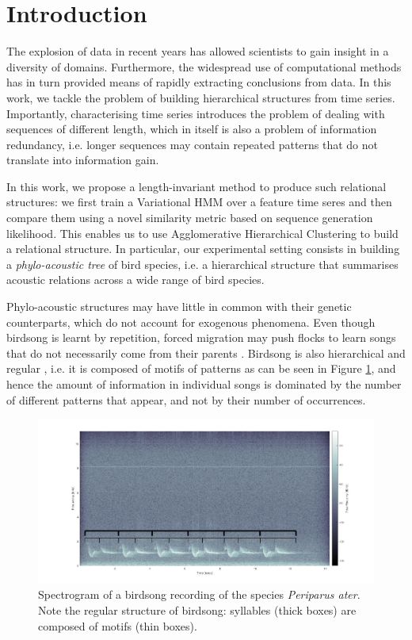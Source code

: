 \documentclass[pdftex,11pt,a4paper]{article}
\theoremstyle{definition}
\theoremstyle{remark}
\begin{document}
\section{Introduction}
\label{section_introduction}
The explosion of data in recent years has allowed scientists to gain insight in a diversity of domains. Furthermore, the widespread use of computational methods has in turn provided means of rapidly extracting conclusions from data. In this work, we tackle the problem of building hierarchical structures from time series. Importantly, characterising time series introduces the problem of dealing with sequences of different length, which in itself is also a problem of information redundancy, i.e. longer sequences may contain repeated patterns that do not translate into information gain.
\par In this work, we propose a length-invariant method to produce such relational structures: we first train a Variational HMM over a feature time seres and then compare them using a novel similarity metric based on sequence generation likelihood. This enables us to use Agglomerative Hierarchical Clustering to build a relational structure. In particular, our experimental setting consists in building a \textit{phylo-acoustic tree} of bird species, i.e. a hierarchical structure that summarises acoustic relations across a wide range of bird species.
\par Phylo-acoustic structures may have little in common with their genetic counterparts, which do not account for exogenous phenomena. Even though birdsong is learnt by repetition, forced migration may push flocks to learn songs that do not necessarily come from their parents \cite{Berwick2013}. Birdsong is also hierarchical and regular \cite{Snowdon2013}, i.e. it is composed of motifs of patterns as can be seen in Figure \ref{fig_birdsong_structure}, and hence the amount of information in individual songs is dominated by the number of different patterns that appear, and not by their number of occurrences. 

\begin{figure}[t]
\centering
\includegraphics[width=\textwidth]{images/birdsong_structure}
\caption{Spectrogram of a birdsong recording of the species \emph{Periparus ater}. Note the regular structure of birdsong: syllables (thick boxes) are composed of motifs (thin boxes).}
\label{fig_birdsong_structure}
\end{figure}
\end{document}
